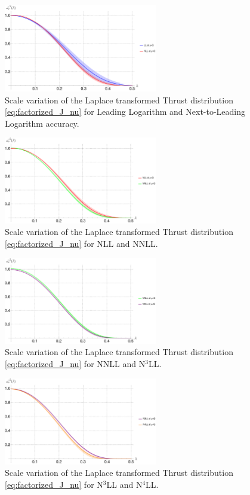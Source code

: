 \documentclass[../Tesi_Jiahao_Miao_986136.tex]{subfiles}
\begin{document}
\begin{figure}[h!]
    \centering
    \includegraphics[width=0.6\textwidth]{figures/scale_variation_LL-NLL.png}
    \caption{Scale variation of the Laplace transformed Thrust distribution \cref{eq:factorized_J_nu} for Leading Logarithm and Next-to-Leading Logarithm accuracy.}
\end{figure}
\begin{figure}[h!]
    \centering
    \includegraphics[width=0.6\textwidth]{figures/scale_variation_NLL-NNLL.png}
    \caption{Scale variation of the Laplace transformed Thrust distribution \cref{eq:factorized_J_nu} for NLL and NNLL.}
\end{figure}
\begin{figure}[h!]
    \centering
    \includegraphics[width=0.6\textwidth]{figures/scale_variation_NNLL-N3LL.png}
    \caption{Scale variation of the Laplace transformed Thrust distribution \cref{eq:factorized_J_nu} for NNLL and N$^3$LL.}
\end{figure}
\begin{figure}[h!]
    \centering
    \includegraphics[width=0.6\textwidth]{figures/scale_variation_N3LL-N4LL.png}
    \caption{Scale variation of the Laplace transformed Thrust distribution \cref{eq:factorized_J_nu} for N$^3$LL and N$^4$LL.}
\end{figure}
\end{document}
